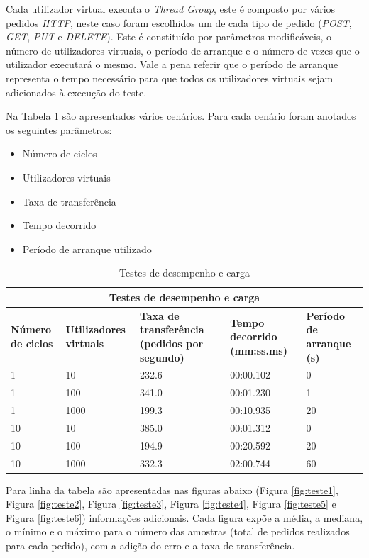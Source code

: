 Cada utilizador virtual executa o \textit{Thread Group}, este é composto por vários pedidos \textit{HTTP}, neste caso foram escolhidos um de cada tipo de pedido (\textit{POST}, \textit{GET}, \textit{PUT} e \textit{DELETE}). Este é constituído por parâmetros modificáveis, o número de utilizadores virtuais, o período de arranque e o número de vezes que o utilizador executará o mesmo. Vale a pena referir que o período de arranque representa o tempo necessário para que todos os utilizadores virtuais sejam adicionados à execução do teste.

Na Tabela \ref{table:desempenho} são apresentados vários cenários. Para cada cenário foram anotados os seguintes parâmetros:
\begin{itemize}
    \item Número de ciclos
    \item Utilizadores virtuais
    \item Taxa de transferência 
    \item Tempo decorrido
    \item Período de arranque utilizado
\end{itemize}

\begin{table}[H]
\caption{Testes de desempenho e carga}
\label{table:desempenho}
\begin{center}
\begin{tabular}{ |p{2.5cm}|p{2.5cm}|p{2.5cm}|p{2.5cm}|p{2.5cm}|  }
\hline
\multicolumn{5}{|c|}{Testes de desempenho e carga} \\
\hline
\textbf{Número de ciclos} & \textbf{Utilizadores virtuais} & \textbf{Taxa de transferência (pedidos por segundo)} & \textbf{Tempo decorrido (mm:ss.ms)} & \textbf{Período de arranque (s)}\\
\hline
1 & 10 & 232.6 & 00:00.102 & 0\\
\hline
1 & 100 & 341.0 & 00:01.230 & 1\\
\hline
1 & 1000 & 199.3 & 00:10.935 & 20\\
\hline
10 & 10 & 385.0 & 00:01.312 & 0\\
\hline
10 & 100 & 194.9 & 00:20.592 & 20\\
\hline
10 & 1000 & 332.3 & 02:00.744 & 60\\
\hline
\end{tabular} 
\end{center}
\end{table}

Para linha da tabela são apresentadas nas figuras abaixo (Figura \ref{fig:teste1}, Figura \ref{fig:teste2}, Figura \ref{fig:teste3}, Figura \ref{fig:teste4}, Figura \ref{fig:teste5} e Figura \ref{fig:teste6}) informações adicionais. Cada figura expõe a média, a mediana, o mínimo e o máximo para o número das amostras (total de pedidos realizados para cada pedido), com a adição do erro e a taxa de transferência. 

